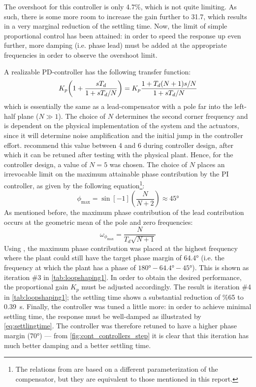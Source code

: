 The overshoot for this controller is only 4.7\%, which is not quite limiting. As such, there is some more room to increase the gain further to 31.7, which results in a very marginal reduction of the settling time. Now, the limit of simple proportional control has been attained: in order to speed the response up even further, more damping (i.e. phase lead) must be added at the appropriate frequencies in order to observe the overshoot limit.

A realizable PD-controller has the following transfer function:
\begin{equation}
K_p \qty(1 + \frac{sT_d}{1 + sT_d/N}) = K_p\frac{1 + T_d(N+1)s/N}{1 + sT_d/N}
\label{eq:leadcomp}
\end{equation}
which is essentially the same as a lead-compensator with a pole far into the left-half plane ($N \gg 1$). The choice of $N$ determines the second corner frequency and is dependent on the physical implementation of the system and the actuators, since it will determine noise amplification and the initial jump in the controller effort. \textcite{keviczky} recommend this value between 4 and 6 during controller design, after which it can be retuned after testing with the physical plant. Hence, for the controller design, a value of $N=5$ was chosen. The choice of $N$ places an irrevocable limit on the maximum attainable phase contribution by the PI controller, as given by the following equation\footnote{The relations from \textcite{ogata} are based on a different parameterization of the compensator, but they are equivalent to those mentioned in this report.}: \cite{ogata}
\begin{equation}
\phi_\text{max} = \sin[-1](\frac{N}{N + 2}) \approx \ang{45}
\label{eq:maxphi}
\end{equation}
As mentioned before, the maximum phase contribution of the lead contribution occurs at the geometric mean of the pole and zero frequencies: \cite{ogata}
\begin{equation}
    \omega_{\phi_\text{max}} = \frac{N}{T_d\sqrt{N+1}}
    \label{eq:omegamaxphi}
\end{equation}
Using , the maximum phase contribution was placed at the highest frequency where the plant could still have the target phase margin of \ang{64.4} (i.e. the frequency at which the plant has a phase of $\ang{180} - \ang{64.4}  - \ang{45}$). This is shown as iteration \#3 in \cref{tab:loopshaping1}. In order to obtain the desired performance, the proportional gain $K_p$ must be adjusted accordingly. The result is iteration \#4 in \cref{tab:loopshaping1}; the settling time shows a substantial reduction of \%65 to \SI{0.39}{\second}. Finally, the controller was tuned a little more: in order to achieve minimal settling time, the response must be well-damped as illustrated by \cref{eq:settlingtime}. The controller was therefore retuned to have a higher phase margin (\ang{70}) --- from \cref{fig:cont_controllers_step} it is clear that this iteration has much better damping and a better settling time.
